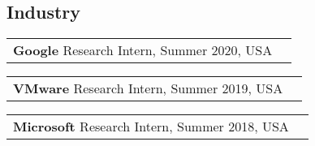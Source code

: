 \documentclass[margin,line]{res}
\begin{document}
\begin{resume}

\section{\sc Industry}

\begin{tabular}{@{}p{5.5in}p{4in}}
{\bf Google} \dotfill Research Intern, Summer 2020, USA\\
\end{tabular}

\vspace{-2.5pt}
\begin{tabular}{@{}p{5.5in}p{4in}}
{\bf VMware} \dotfill Research Intern, Summer 2019, USA\\
\end{tabular}

\vspace{-2.5pt}
\begin{tabular}{@{}p{5.5in}p{4in}}
{\bf Microsoft} \dotfill Research Intern, Summer 2018, USA\\
\end{tabular}


\end{resume}
\end{document}
